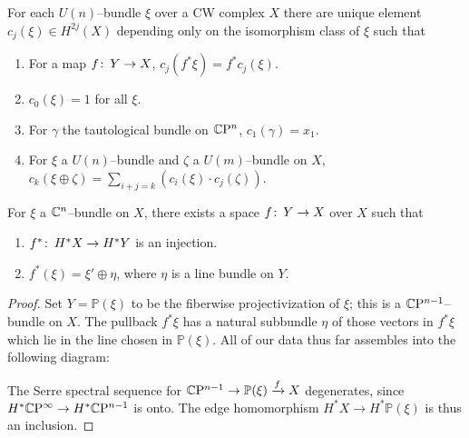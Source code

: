 \begin{subappendices}
\begin{theorem}
For each $U(n)$--bundle $\xi$ over a CW complex $X$ there are unique element $c_j(\xi) \in H^{2j}(X)$ depending only on the isomorphism class of $\xi$ such that
\begin{enumerate}
    \item For a map $f\colon\thinspace Y \to X$, $c_j(f^* \xi) = f^* c_j(\xi)$.
    \item $c_0(\xi) = 1$ for all $\xi$.
    \item For $\gamma$ the tautological bundle on $\mathbb C \mathrm{P}^n$, $c_1(\gamma) = x_1$.
    \item For $\xi$ a $U(n)$--bundle and $\zeta$ a $U(m)$--bundle on $X$, $c_k(\xi \oplus \zeta) = \sum_{i+j=k} (c_i(\xi) \cdot c_j(\zeta))$.
\end{enumerate}
\end{theorem}

\begin{lemma}
For $\xi$ a $\mathbb C^n$--bundle on $X$, there exists a space $f\colon\thinspace Y \to X$ over $X$ such that
\begin{enumerate}
    \item $f^*\colon\thinspace H^* X \to H^* Y$ is an injection.
    \item $f^*(\xi) = \xi' \oplus \eta$, where $\eta$ is a line bundle on $Y$.
\end{enumerate}
\end{lemma}
\begin{proof}
Set $Y = \mathbb P(\xi)$ to be the fiberwise projectivization of $\xi$; this is a $\mathbb C \mathrm{P}^{n-1}$--bundle on $X$.  The pullback $f^* \xi$ has a natural subbundle $\eta$ of those vectors in $f^* \xi$ which lie in the line chosen in $\mathbb P(\xi)$.  All of our data thus far assembles into the following diagram:
\begin{center}
\end{center}
The Serre spectral sequence for $\mathbb C \mathrm{P}^{n-1} \to \mathbb P(\xi) \xrightarrow f X$ degenerates, since $H^* \mathbb C \mathrm{P}^\infty \to H^* \mathbb C \mathrm{P}^{n-1}$ is onto.  The edge homomorphism $H^* X \to H^* \mathbb P(\xi)$ is thus an inclusion.
\end{proof}


\end{subappendices}
